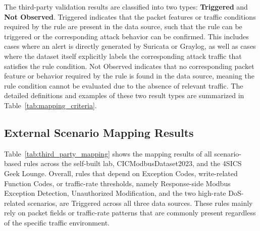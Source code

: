 The third-party validation results are classified into two types: \textbf{Triggered} and \textbf{Not Observed}. Triggered indicates that the packet features or traffic conditions required by the rule are present in the data source, such that the rule can be triggered or the corresponding attack behavior can be confirmed. This includes cases where an alert is directly generated by Suricata or Graylog, as well as cases where the dataset itself explicitly labels the corresponding attack traffic that satisfies the rule condition. Not Observed indicates that no corresponding packet feature or behavior required by the rule is found in the data source, meaning the rule condition cannot be evaluated due to the absence of relevant traffic. The detailed definitions and examples of these two result types are summarized in Table~\ref{tab:mapping_criteria}.

\begin{table}[htbp]
\caption{Mapping Criteria for Third-party Validation}
\centering
\footnotesize
\renewcommand{\arraystretch}{1.4}

\label{tab:mapping_criteria}
\end{table}
\newpage

\subsection{External Scenario Mapping Results}
Table~\ref{tab:third_party_mapping} shows the mapping results of all scenario-based rules across the self-built lab, CICModbusDataset2023, and the 4SICS Geek Lounge. Overall, rules that depend on Exception Codes, write-related Function Codes, or traffic-rate thresholds, namely Response-side Modbus Exception Detection, Unauthorized Modification, and the two high-rate DoS-related scenarios, are Triggered across all three data sources. These rules mainly rely on packet fields or traffic-rate patterns that are commonly present regardless of the specific traffic environment.

